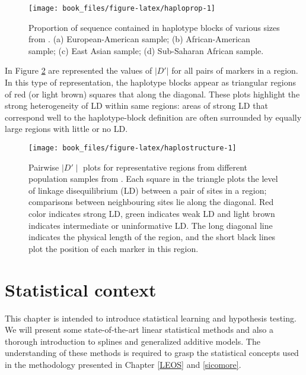 \documentclass[]{book}
\begin{document}
\begin{figure}

{\centering \texttt{[image: book\_files/figure-latex/haploprop-1]} 

}

\caption{Proportion of sequence contained in haplotype blocks of various sizes from \citep{wall2003haplotype}. (a) European-American sample; (b) African-American sample; (c) East Asian sample; (d) Sub-Saharan African sample.}\label{fig:haploprop}
\end{figure}

In Figure \ref{fig:haplostructure} are represented the values of \(|D'|\)
for all pairs of markers in a region. In this type of representation,
the haplotype blocks appear as triangular regions of red (or light
brown) squares that along the diagonal. These plots highlight the strong
heterogeneity of LD within same regions: areas of strong LD that
correspond well to the haplotype-block definition are often surrounded
by equally large regions with little or no LD.



\begin{figure}

{\centering \texttt{[image: book\_files/figure-latex/haplostructure-1]} 

}

\caption{Pairwise \(\mid D' \mid\) plots for representative regions from different population samples from \citep{wall2003haplotype}. Each square in the triangle plots the level of linkage disequilibrium (LD) between a pair of sites in a region; comparisons between neighbouring sites lie along the diagonal. Red color indicates strong LD, green indicates weak LD and light brown indicates intermediate or uninformative LD. The long diagonal line indicates the physical length of the region, and the short black lines plot the position of each marker in this region.}\label{fig:haplostructure}
\end{figure}

\hypertarget{stat}{%
\chapter{Statistical context}\label{stat}}

This chapter is intended to introduce statistical learning and hypothesis testing. We will present some state-of-the-art linear statistical methods and also a thorough introduction to splines and generalized additive models. The understanding of these methods is required to grasp the statistical concepts used in the methodology presented in Chapter \ref{LEOS} and \ref{sicomore}.
\end{document}
